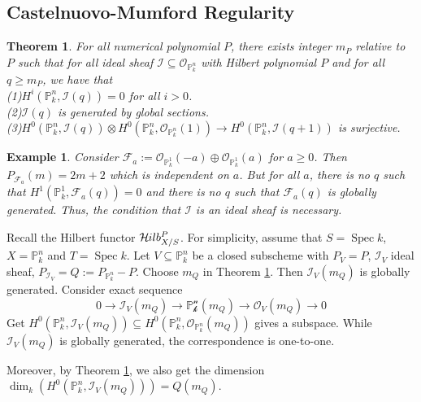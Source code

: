 \documentclass{ctexart}
\newtheorem{theorem}{Theorem}[section]
\newtheorem{example}{Example}[section]
\newcommand{\spec}{\operatorname{Spec}}
\newcommand{\hilbertfunctor}{\mathcal{H}\kern -.5pt ilb}
\begin{document}
\subsection{Castelnuovo-Mumford Regularity}
\begin{theorem}
    For all numerical polynomial $P$, there exists integer $m_{P}$ relative to $P$ such that for all ideal sheaf $\mathcal{I} \subseteq \mathcal{O}_{\mathbb{P}_{k}^{n}}$ with Hilbert polynomial $P$ and for all $q \ge m_{P}$,
    we have that \\
    (1)$H^{i}(\mathbb{P}_{k}^{n}, \mathcal{I}(q)) = 0$ for all $i > 0$. \\
    (2)$\mathcal{I}(q)$ is generated by global sections. \\
    (3)$H^{0}(\mathbb{P}_{k}^{n}, \mathcal{I}(q)) \otimes H^{0}(\mathbb{P}_{k}^{n}, \mathcal{O}_{\mathbb{P}_{k}^{n}}(1)) \longrightarrow H^{0}(\mathbb{P}_{k}^{n}, \mathcal{I}(q + 1))$ is surjective. 
    \label{Theorem 13.3}
\end{theorem}
\begin{example}
    Consider $\mathcal{F}_{a} := \mathcal{O}_{\mathbb{P}_{k}^{1}}(-a) \oplus \mathcal{O}_{\mathbb{P}_{k}^{1}}(a)$ for $a \ge 0$.
    Then $P_{\mathcal{F}_{a}}(m) = 2m + 2$ which is independent on $a$.
    But for all $a$, there is no $q$ such that $H^{1}(\mathbb{P}_{k}^{1}, \mathcal{F}_{a}(q)) = 0$ and there is no $q$ such that $\mathcal{F}_{a}(q)$ is globally generated.
    Thus, the condition that $\mathcal{I}$ is an ideal sheaf is necessary.
\end{example}
Recall the Hilbert functor $\hilbertfunctor_{X/S}^{P}$.
For simplicity, assume that $S = \spec k$, $X = \mathbb{P}_{k}^{n}$ and $T = \spec k$.
Let $V \subseteq \mathbb{P}_{k}^{n}$ be a closed subscheme with $P_{V} = P$, $\mathcal{I}_{V}$ ideal sheaf, $P_{\mathcal{I}_{V}} = Q := P_{\mathbb{P}_{k}^{n}} - P$.
Choose $m_{Q}$ in Theorem \ref{Theorem 13.3}.
Then $\mathcal{I}_{V}(m_{Q})$ is globally generated.
Consider exact sequence
\begin{equation*}
    0 \longrightarrow \mathcal{I}_{V}(m_{Q}) \longrightarrow \mathcal{\mathbb{P}_{k}^{n}}(m_{Q}) \longrightarrow \mathcal{O}_{V}(m_{Q}) \longrightarrow 0
\end{equation*}
Get $H^{0}(\mathbb{P}_{k}^{n}, \mathcal{I}_{V}(m_{Q})) \subseteq H^{0}(\mathbb{P}_{k}^{n}, \mathcal{O}_{\mathbb{P}_{k}^{n}}(m_{Q}))$ gives a subspace.
While $\mathcal{I}_{V}(m_{Q})$ is globally generated, the correspondence is one-to-one.
\par
Moreover, by Theorem \ref{Theorem 13.3}, we also get the dimension $\dim_{k}(H^{0}(\mathbb{P}_{k}^{n}, \mathcal{I}_{V}(m_{Q}))) = Q(m_{Q})$.
\end{document}
